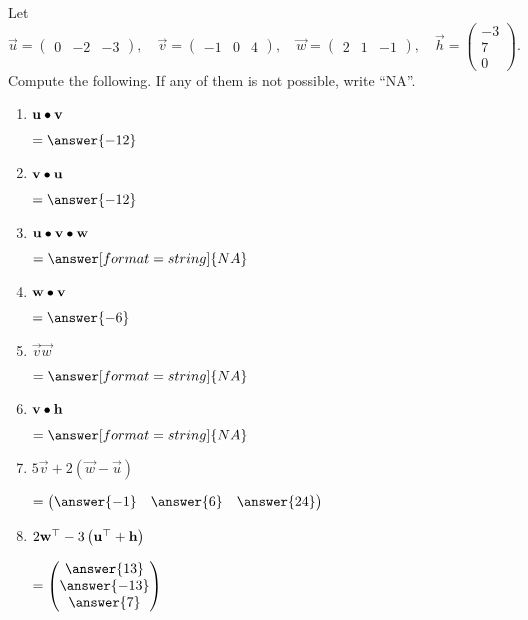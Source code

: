 \documentclass{ximera}
\author{Parisa Fatheddin}
\begin{document}
\begin{exercise}
  Let
  \[
    \vec{u} = \begin{pmatrix} 0 & -2& -3 \end{pmatrix}, \quad
    \vec{v} = \begin{pmatrix} -1 & 0 & 4 \end{pmatrix}, \quad
    \vec{w} = \begin{pmatrix} 2 & 1 & -1 \end{pmatrix}, \quad
    \vec{h} = \begin{pmatrix} -3\\ 7\\ 0 \end{pmatrix}.
  \]
  Compute the following. If any of them is not possible, write ``NA''.
  \begin{enumerate}
    \item $\mathbf{u}\bullet \mathbf{v}$ \begin{prompt}$= \answer{-12}$\end{prompt}
    \item $\mathbf{v}\bullet \mathbf{u}$ \begin{prompt}$= \answer{-12}$\end{prompt}
    \item $\mathbf{u}\bullet \mathbf{v} \bullet\mathbf{w} $\begin{prompt} $= \answer[format=string]{NA}$\end{prompt}
    \item $\mathbf{w}\bullet \mathbf{v} $\begin{prompt} $=\answer{-6}$\end{prompt}
    \item $\vec{v}\vec{w}$ \begin{prompt} $= \answer[format=string]{NA}$\end{prompt}
    \item $\mathbf{v} \bullet \mathbf{h}$ \begin{prompt}$= \answer[format=string]{NA}$\end{prompt}
    \item $5 \vec{v} + 2\left(\vec{w}-\vec{u}\right)$ \begin{prompt} $= \begin{pmatrix} \answer{-1} & \answer{6} & \answer{24}\end{pmatrix}$ \end{prompt}
    \item $2 \mathbf{w}^\top - 3\left(\mathbf{u}^\top + \mathbf{h}\right)$\begin{prompt}$= \begin{pmatrix} \answer{13} \\
      \answer{-13}\\
      \answer{7}
    \end{pmatrix}$\end{prompt}
  \pdfOnly{\end{multicols}}
\end{enumerate}
\end{exercise}
\end{document}
